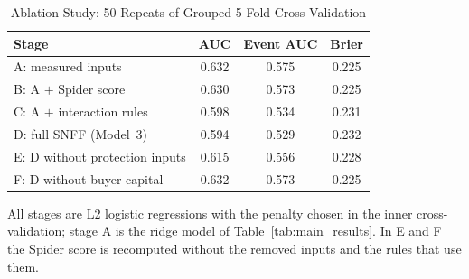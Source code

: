 \begin{table}[!t]
\caption{Ablation Study: 50 Repeats of Grouped 5-Fold Cross-Validation}
\label{tab:ablation}
\centering
\footnotesize
\setlength{\tabcolsep}{4pt}
\begin{tabular}{lccc}
\toprule
\textbf{Stage} & \textbf{AUC} & \textbf{Event AUC} & \textbf{Brier} \\
\midrule
A: measured inputs & 0.632 & 0.575 & 0.225 \\
B: A $+$ Spider score & 0.630 & 0.573 & 0.225 \\
C: A $+$ interaction rules & 0.598 & 0.534 & 0.231 \\
D: full SNFF (Model~3) & 0.594 & 0.529 & 0.232 \\
E: D without protection inputs & 0.615 & 0.556 & 0.228 \\
F: D without buyer capital & 0.632 & 0.573 & 0.225 \\
\bottomrule
\end{tabular}
\par\vspace{2pt}\parbox{0.94\columnwidth}{\scriptsize All stages are L2 logistic regressions with the penalty chosen in the inner
cross-validation; stage A is the ridge model of Table~\ref{tab:main_results}. In E and F the Spider score is recomputed
without the removed inputs and the rules that use them.}
\end{table}
